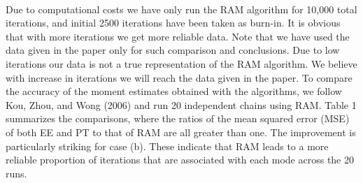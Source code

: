 \documentclass{article}
\begin{document}
\paragraph{}Due to computational costs we have only run the RAM algorithm for 10,000 total iterations, and initial 2500 iterations have been taken as burn-in. It is obvious that with more iterations we get more reliable data. Note that we have used the data given in the paper only for such comparison and conclusions. Due to low iterations our data is not a true representation of the RAM algorithm. We believe with increase in iterations we will reach the data given in the paper. To compare the accuracy of the moment estimates obtained
with the algorithms, we follow Kou, Zhou, and Wong
(2006) and run 20 independent chains using RAM. Table 1 summarizes the comparisons, where the ratios of the mean squared
error (MSE) of both EE and PT to that of RAM are all greater
than one. The improvement is particularly striking for case (b).
These indicate that RAM leads to a more reliable proportion of
iterations that are associated with each mode across the 20 runs.
\end{document}
